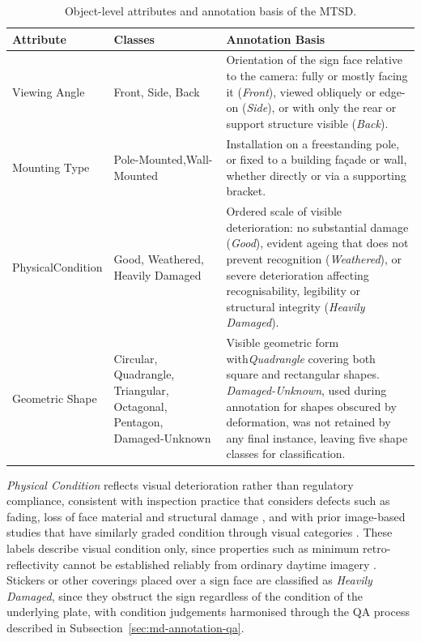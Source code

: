 \begin{table}[H]
\centering
\caption{Object-level attributes and annotation basis of the \gls{MTSD}.}
\label{tab:mtsd-attributes}
\begin{tabularx}{\textwidth}{@{}p{3.0cm} p{3.9cm} X@{}}
\toprule
\textbf{Attribute} & \textbf{Classes} & \textbf{Annotation Basis} \\
\midrule

Viewing Angle
& Front, Side, Back
& Orientation of the sign face relative to the camera: fully or mostly facing it (\emph{Front}), viewed obliquely or edge-on (\emph{Side}), or with only the rear or support structure visible (\emph{Back}). \\

\addlinespace[0.5em]

Mounting Type
& Pole-Mounted,\newline Wall-Mounted
& Installation on a freestanding pole, or fixed to a building fa\c{c}ade or wall, whether directly or via a supporting bracket. \\

\addlinespace[0.5em]

Physical\newline Condition
& Good, Weathered, Heavily Damaged
& Ordered scale of visible deterioration: no substantial damage (\emph{Good}), evident ageing that does not prevent recognition (\emph{Weathered}), or severe deterioration affecting recognisability, legibility or structural integrity (\emph{Heavily Damaged}). \\

\addlinespace[0.5em]

Geometric Shape
& Circular, Quadrangle, Triangular, Octagonal, Pentagon, Damaged-Unknown
& Visible geometric form with\emph{Quadrangle} covering both square and rectangular shapes. \emph{Damaged-Unknown}, used during annotation for shapes obscured by deformation, was not retained by any final instance, leaving five shape classes for classification.\\

\bottomrule
\end{tabularx}
\end{table}

\noindent \emph{Physical Condition} reflects visual deterioration rather than regulatory compliance, consistent with inspection practice that considers defects such as fading, loss of face material and structural damage \cite{BG29-sign-inspection}, and with prior image-based studies that have similarly graded condition through visual categories \cite{BG30-sign-visual-condition}. These labels describe visual condition only, since properties such as minimum retro-reflectivity cannot be established reliably from ordinary daytime imagery \cite{BG31-daytime-retroreflectivity}. Stickers or other coverings placed over a sign face are classified as \emph{Heavily Damaged}, since they obstruct the sign regardless of the condition of the underlying plate, with condition judgements harmonised through the \gls{QA} process described in Subsection~\ref{sec:md-annotation-qa}.

